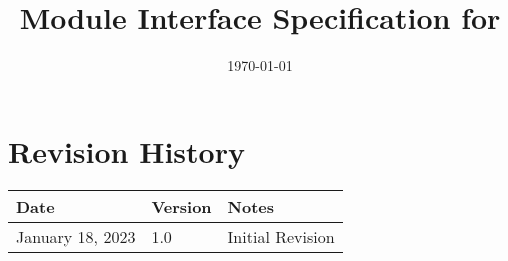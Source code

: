 \documentclass[12pt, titlepage]{article}
\begin{document}
\title{Module Interface Specification for \progname{}}

\author{\authname}

\date{\today}

\maketitle


\section{Revision History}

\begin{tabularx}{\textwidth}{p{3cm}p{2cm}X}
\toprule {\bf Date} & {\bf Version} & {\bf Notes}\\
\midrule
January 18, 2023 & 1.0 & Initial Revision\\
\bottomrule
\end{tabularx}

~\newpage
\end{document}
